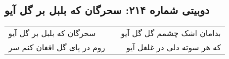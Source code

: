 \begin{center}
\section*{دوبیتی شماره ۲۱۴: سحرگان که بلبل بر گل آیو}
\label{sec:214}
\begin{longtable}{l p{0.5cm} r}
سحرگان که بلبل بر گل آیو
&&
بدامان اشک چشمم گل گل آیو
\\
روم در پای گل افغان کنم سر
&&
که هر سوته دلی در غلغل آیو
\\
\end{longtable}
\end{center}
